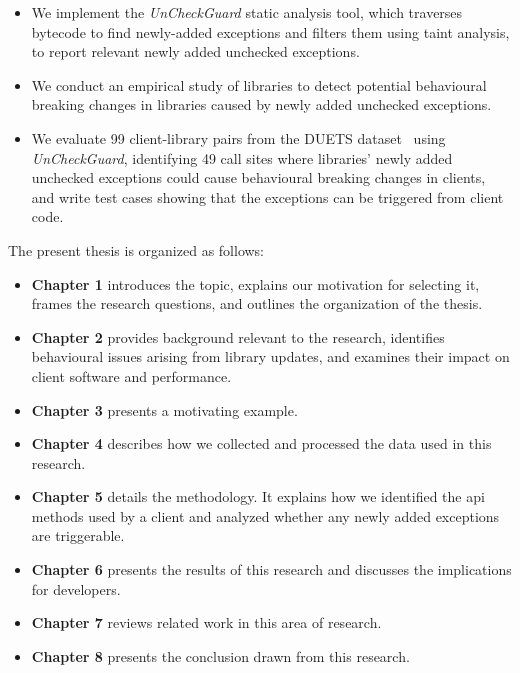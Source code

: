 \begin{itemize}
    \item We implement the \textit{UnCheckGuard} static analysis tool, which traverses bytecode to find newly-added exceptions and filters them using taint analysis, to report relevant newly added unchecked exceptions.
    \item We conduct an empirical study of libraries to detect potential behavioural breaking changes in libraries caused by newly added unchecked exceptions.
    \item We evaluate 99 client-library pairs from the DUETS dataset~\cite{durieux21:_duets} using \textit{UnCheckGuard}, identifying 49 call sites where libraries' newly added unchecked exceptions could cause behavioural breaking changes in clients, and write test cases showing that the exceptions can be triggered from client code.
\end{itemize}

The present thesis is organized as follows:
\begin{itemize}
    \item \textbf{Chapter 1} introduces the topic, explains our motivation for selecting it, frames the research questions, and outlines the organization of the thesis.
    \item \textbf{Chapter 2} provides background relevant to the research, identifies behavioural issues arising from library updates, and examines their impact on client software and performance.
    \item \textbf{Chapter 3} presents a motivating example.
    \item \textbf{Chapter 4} describes how we collected and processed the data used in this research.
    \item \textbf{Chapter 5} details the methodology. It explains how we identified the \gls{api} methods used by a client and analyzed whether any newly added exceptions are triggerable.
    \item \textbf{Chapter 6} presents the results of this research and discusses the implications for developers.
    \item \textbf{Chapter 7} reviews related work in this area of research.
    \item \textbf{Chapter 8} presents the conclusion drawn from this research.
\end{itemize}